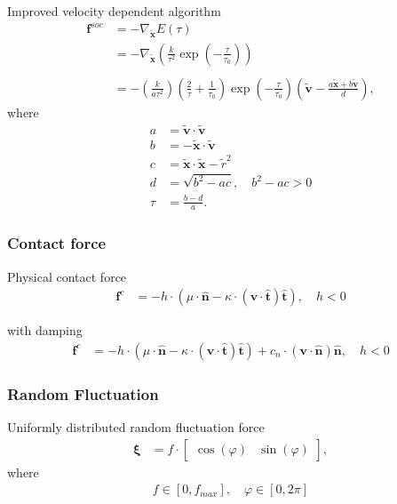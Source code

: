 Improved velocity dependent algorithm
\begin{align}
\mathbf{f}^{soc} &= -\nabla_{\tilde{\mathbf{x}}} E(\tau)  \\
&= -\nabla_{\tilde{\mathbf{x}}} \left(\frac{k}{\tau^{2}} \exp \left( -\frac{\tau}{\tau_{0}} \right) \right) \\
\\
&= - \left(\frac{k}{a \tau^{2}}\right) 
\left(\frac{2}{\tau} + \frac{1}{\tau_{0}}\right) 
\exp\left (-\frac{\tau}{\tau_{0}}\right )
\left(\tilde{\mathbf{v}} -\frac{a \tilde{\mathbf{x}} + b \tilde{\mathbf{v}}}{d} \right),
\end{align}
where
\begin{align}
a &= \tilde{\mathbf{v}} \cdot \tilde{\mathbf{v}} \\
b &= -\tilde{\mathbf{x}} \cdot \tilde{\mathbf{v}} \\
c &= \tilde{\mathbf{x}} \cdot \tilde{\mathbf{x}} - \tilde{r}^{2} \\
d &= \sqrt{b^{2} - a c}, \quad b^{2} - a c > 0 \\
\tau &= \frac{b - d}{a}.
\end{align}


\subsubsection{Contact force}
Physical contact force
\begin{align}
\mathbf{f}^{c} &= - h \cdot \left(\mu \cdot \hat{\mathbf{n}} - \kappa \cdot (\mathbf{v} \cdot \hat{\mathbf{t}}) \hat{\mathbf{t}}\right), \quad h < 0
\end{align}

with damping
\begin{align}
\mathbf{f}^{c} &= - h \cdot \left(\mu \cdot \hat{\mathbf{n}} - \kappa \cdot (\mathbf{v} \cdot \hat{\mathbf{t}}) \hat{\mathbf{t}}\right) + c_{n} \cdot (\mathbf{v} \cdot \hat{\mathbf{n}}) \hat{\mathbf{n}} , \quad h < 0
\end{align}


\subsubsection{Random Fluctuation}
Uniformly distributed random fluctuation force
\begin{align}
\boldsymbol{\xi} &= f \cdot \begin{bmatrix} \cos(\varphi) & \sin(\varphi) \end{bmatrix},
\end{align}
where
\begin{align}
f \in [0, f_{max}],\quad \varphi \in [0, 2 \pi]
\end{align}


